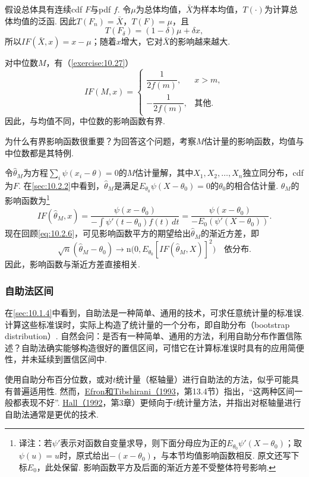 \begin{example}[均值与中位数的影响函数]\label{ex:10.6.2}
假设总体具有连续cdf $F$与pdf $f$. 令$\mu$为总体均值，$\bar X$为样本均值，$T(\cdot)$为计算总体均值的泛函. 因此$T(F_n)=\bar X$，$T(F)=\mu$，且
$$T(F_\delta)=(1-\delta)\mu+\delta x,$$
所以$IF(\bar X,x)=x-\mu$；随着$x$增大，它对$\bar X$的影响越来越大.

对中位数$M$，有（\autoref{exercise:10.27}）
$$IF(M,x)=\begin{cases}\dfrac1{2f(m)},&x>m,\\-\dfrac1{2f(m)},&\text{其他}.\end{cases}$$
因此，与均值不同，中位数的影响函数有界.
\end{example}

为什么有界影响函数很重要？为回答这个问题，考察$M$估计量的影响函数，均值与中位数都是其特例.

令$\hat\theta_M$为方程$\sum_i\psi(x_i-\theta)=0$的$M$估计量解，其中$X_1,X_2,\ldots,X_n$独立同分布，cdf为$F$. 在\autoref{sec:10.2.2}中看到，$\hat\theta_M$是满足$E_{\theta_0}\psi(X-\theta_0)=0$的$\theta_0$的相合估计量. $\hat\theta_M$的影响函数为\footnote{译注：若$\psi'$表示对函数自变量求导，则下面分母应为正的$E_{\theta_0}\psi'(X-\theta_0)$；取$\psi(u)=u$时，原式给出$-(x-\theta_0)$，与本节均值影响函数相反. 原文还写下标$E_0$，此处保留. 影响函数平方及后面的渐近方差不受整体符号影响.}
$$IF(\hat\theta_M,x)=\frac{\psi(x-\theta_0)}{-\int\psi'(t-\theta_0)f(t)\,dt}
=\frac{\psi(x-\theta_0)}{-E_0(\psi'(X-\theta_0))}.$$
现在回顾\eqref{eq:10.2.6}，可见影响函数平方的期望给出$\hat\theta_M$的渐近方差，即
$$\sqrt n(\hat\theta_M-\theta_0)\longrightarrow\mathrm n\bigl(0,E_{\theta_0}[IF(\hat\theta_M,X)]^2\bigr)\quad\text{依分布}.$$
因此，影响函数与渐近方差直接相关.

\subsubsection{自助法区间}\label{sec:10.6.5}
在\autoref{sec:10.1.4}中看到，自助法是一种简单、通用的技术，可求任意统计量的标准误. 计算这些标准误时，实际上构造了统计量的一个分布，即自助分布（bootstrap distribution\mbox{）.} 自然会问：是否有一种简单、通用的方法，利用自助分布作置信陈述？自助法确实能够构造很好的置信区间，可惜它在计算标准误时具有的应用简便性，并未延续到置信区间中.

使用自助分布百分位数，或对$t$统计量（枢轴量）进行自助法的方法，似乎可能具有普遍适用性. 然而，\hyperref[bib:source114]{Efron和Tibshirani（1993}，第13.4节）指出，“这两种区间一般都表现不好”. \hyperref[bib:source154]{Hall（1992}，第3章）更倾向于$t$统计量方法，并指出对枢轴量进行自助法通常是更优的技术.

